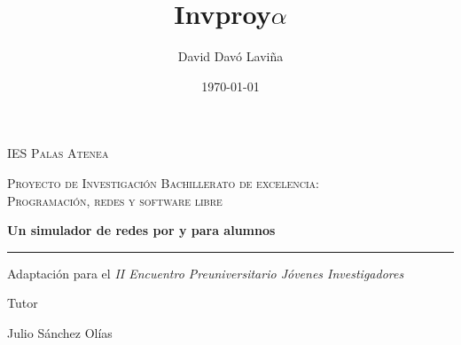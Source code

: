 \documentclass[a4paper, 11pt]{report} %
\title{Invproy\space $\alpha$}
\author{David Davó Laviña}
\date{\today{}}
\begin{document}

\makeatletter
\begin{titlepage}{\fontsize{11}{14}
\centering
\vspace*{1cm}
{\sffamily\scshape\huge IES Palas Atenea \par}
\vspace{2cm}
{\sffamily\scshape\LARGE Proyecto de Investigación Bachillerato de excelencia:\\
Programación, redes y software libre\par}
\vspace{1.5cm}
{\sffamily\fontsize{42pt}{42pt}\bfseries\color{DarkRed} \@title\par}
{\sffamily\fontsize{24pt}{24pt}\bfseries Un simulador de redes por y para alumnos \par}
{\sffamily\color{DarkRed}\rule{0.5\textwidth}{1pt}\par}
\vspace{.3cm}
{\sffamily\small Adaptación para el \textit{II Encuentro Preuniversitario Jóvenes Investigadores}\par}
\vspace{1.6cm}
{\sffamily\LARGE\itshape \@author\par}
\vfill
{\sffamily\Large Tutor\par
Julio Sánchez Olías}

\vfill

{\sffamily\Large \@date\par}
\restoregeometry
}
\end{titlepage}
\clearpage




\renewcommand\cftchapfont{\bf\color{chaptercolour}}
\renewcommand\cftchappagefont{\bf\color{chaptercolour}}
\end{document}
